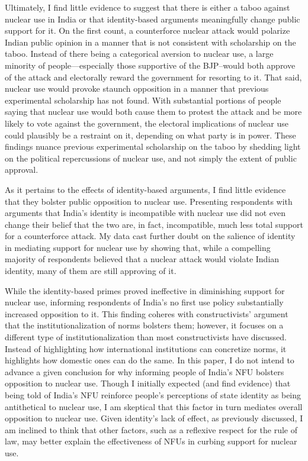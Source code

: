 \documentclass[12pt]{article}
\begin{document}
Ultimately, I find little evidence to suggest that there is either a taboo against nuclear use in India or that identity-based arguments meaningfully change public support for it. On the first count, a counterforce nuclear attack would polarize Indian public opinion in a manner that is not consistent with scholarship on the taboo. Instead of there being a categorical aversion to nuclear use, a large minority of people—especially those supportive of the BJP–would both approve of the attack and electorally reward the government for resorting to it. That said, nuclear use would provoke staunch opposition in a manner that previous experimental scholarship has not found. With substantial portions of people saying that nuclear use would both cause them to protest the attack and be more likely to vote against the government, the electoral implications of nuclear use could plausibly be a restraint on it, depending on what party is in power. These findings nuance previous experimental scholarship on the taboo by shedding light on the political repercussions of nuclear use, and not simply the extent of public approval.

As it pertains to the effects of identity-based arguments, I find little evidence that they bolster public opposition to nuclear use. Presenting respondents with arguments that India's identity is incompatible with nuclear use did not even change their belief that the two are, in fact, incompatible, much less total support for a counterforce attack. My data cast further doubt on the salience of identity in mediating support for nuclear use by showing that, while a compelling majority of respondents believed that a nuclear attack would violate Indian identity, many of them are still approving of it.

While the identity-based primes proved ineffective in diminishing support for nuclear use, informing respondents of India's no first use policy substantially increased opposition to it. This finding coheres with constructivists' argument that the institutionalization of norms bolsters them; however, it focuses on a different type of institutionalization than most constructivists have discussed. Instead of highlighting how international institutions can concretize norms, it highlights how domestic ones can do the same. In this paper, I do not intend to advance a given conclusion for why informing people of India's NFU bolsters opposition to nuclear use. Though I initially expected (and find evidence) that being told of India's NFU reinforce people's perceptions of state identity as being antithetical to nuclear use, I am skeptical that this factor in turn mediates overall opposition to nuclear use. Given identity's lack of effect, as previously discussed, I am inclined to think that other factors, such as a reflexive respect for the rule of law, may better explain the effectiveness of NFUs in curbing support for nuclear use. 
\end{document}

